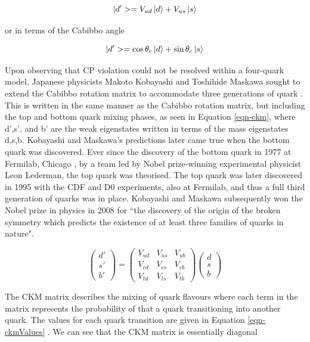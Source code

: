 \begin{equation}
|d'> = V_{ud}\ket{d} + V_{us}\ket{s}
\end{equation}

or in terms of the Cabibbo angle 

\begin{equation}
|d'> = \cos\theta_c\ket{d} + \sin\theta_c\ket{s}
\end{equation}

Upon observing that CP violation could not be resolved within a four-quark model, Japanese physicists Makoto Kobayashi and Toshihide Maskawa 
sought to extend the Cabibbo rotation matrix to accommodate three generations of quark \cite{Kobayashi:1973fv}. This is written in the same 
manner as the Cabibbo rotation matrix, but including the top and bottom quark mixing phases, as seen in Equation \ref{eqn-ckm}, where d',s', 
and b' are the weak eigenstates written in terms of the mass eigenstates d,s,b. Kobayashi and Maskawa's predictions later came true when the 
bottom quark was discovered. Ever since the discovery of the bottom quark in 1977 at Fermilab, Chicago \cite{Innes:1977ae}, by a team led by 
Nobel prize-winning experimental physicist Leon Lederman, the top quark was theorised. The top quark was later discovered in 1995 with the CDF
\cite{PhysRevLett.74.2626} and D0 \cite{PhysRevLett.74.2422} experiments, also at Fermilab, and thus a full third generation of quarks was in 
place. Kobayashi and Maskawa subsequently won the Nobel prize in physics in 2008 for ``the discovery of the origin of the broken symmetry which 
predicts the existence of at least three families of quarks in nature".

\begin{equation} \label{equ-CKM}
\begin{pmatrix}
d' \\
s' \\
b' 
\end{pmatrix}
=
\begin{pmatrix}
V_{ud} & V_{us} & V_{ub} \\
V_{cd} & V_{cs} & V_{cb} \\
V_{td} & V_{ts} & V_{tb} 
\end{pmatrix}
\begin{pmatrix}
d \\
s \\
b 
\end{pmatrix}
\end{equation}

The CKM matrix describes the mixing of quark flavours where each term in the matrix represents the probability of that a quark transitioning 
into another quark. The values for each quark transition are given in Equation \ref{eqn-ckmValues} \cite{ckmValues}. We can see that the CKM matrix is essentially 
diagonal %

